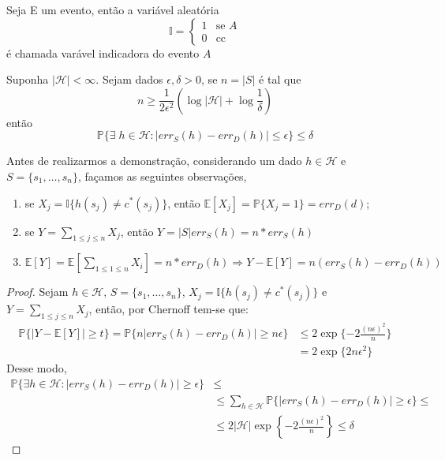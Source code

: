 \begin{definicao}
Seja E um evento, então a variável aleatória
\[
   \mathbb{I} = 
  \begin{cases} 
   1 & \text{se } A \\
   0       & \text{cc }
  \end{cases}
\]
é chamada varável indicadora do evento $A$
\end{definicao}

\begin{teorema}
\label{teorema_ap_mq_1}
Suponha $|\mathcal{H}| < \infty$. Sejam dados  $\epsilon, \delta > 0$, se $n = |S|$ é tal que
\begin{equation*}
n \geq \frac{1}{2\epsilon^2}\left(\log{|\mathcal{H}|} + \log{\frac{1}{\delta}}\right)
\end{equation*}{}
então
\begin{equation*}
    \mathbb{P} \{\exists \; h \in \mathcal{H} :|err_S(h) - err_D(h)| \leq \epsilon\} \leq \delta
\end{equation*}{}
\end{teorema}
Antes de realizarmos a demonstração, considerando um dado $h \in \mathcal{H}$ e $S = \{s_1, \dots, s_n\}$, façamos as seguintes observações, 
\begin{enumerate}
    \item se $X_j = \mathbb{I}\{h(s_j) \neq c^*(s_j)\}$, então $\mathbb{E}[X_j] = \mathbb{P}\{X_j = 1\} = err_D(d)$;
    \item se $Y = \sum_{1 \leq j \leq n}{X_j}$, então $Y = |S|err_S(h) = n*err_S(h)$
    \item $\mathbb{E}[Y] = \mathbb{E}[\sum_{1 \leq 1 \leq n}{X_i}] = n * err_D(h) \Rightarrow Y - \mathbb{E}[Y] = n(err_S(h) - err_D(h))$
\end{enumerate}{}
\begin{proof}
Sejam $h \in \mathcal{H}$, $S = \{s_1, \dots, s_n\}$, $X_j = \mathbb{I}\{h(s_j) \neq c^*(s_j)\}$ e $Y = \sum_{1 \leq j \leq n}{X_j}$, então, por Chernoff tem-se que:
\begin{align*}
    \mathbb{P}\{|Y - \mathbb{E}[Y]| \geq t\} = \mathbb{P}\{n|err_S(h) - err_D(h)| \geq n\epsilon\} &\leq 2\exp\{-2\frac{(n\epsilon)^2}{n}\} \\
    &= 2\exp\{2n\epsilon^2\}
\end{align*}
Desse modo,
\begin{align*}
    \mathbb{P}\{\exists h \in \mathcal{H} : |err_S(h) - err_D(h)| \geq \epsilon\} & \leq \\
    &\leq \sum_{h \in \mathcal{H}}\mathbb{P}\{|err_S(h) - err_D(h)| \geq \epsilon\} \leq \\
    &\leq 2|\mathcal{H}|\exp\left\{-2\frac{(n\epsilon)^2}{n}\right\} \leq \delta
\end{align*}{}

\end{proof}
